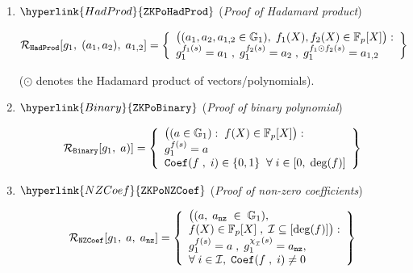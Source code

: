 \documentclass[11pt, lettersize, notitlepage, leqno, footskip=0.6cm]{article}
\newcommand{\bFp}{\mathbb{F}_p}
\newcommand{\slim}{\sum\limits}
\newcommand{\mc}{\mathcal}
\newcommand{\mb}{\mathbb}
\newcommand{\sub}{\subseteq}
\newcommand{\vs}{\vspace{-0.15cm}}
\newcommand{\noin}{\noindent}
\numberwithin{equation}{section}
\begin{document}
\begin{enumerate}[wide, labelwidth=!, labelindent=0pt, itemsep=-0.2ex]
\begin{comment}
\noin ($\circ$ denotes the dot product of vectors/polynomials) \end{comment}

\item $\hyperlink{HadProd}{\tt{ZKPoHadProd}}$ (\textit{Proof of Hadamard product}) \vspace{-3mm}

$$\mc{R}_{\tt{HadProd}}[g_1,\;(a_1,a_2),\; a_{1,2}] = \left\{\begin{array}{l} \big((a_1,a_2, a_{1,2}\in\mb{G}_1),\; f_1(X),f_2(X)\in \bFp[X]\big):\\ g_1^{f_1(s)} = a_1\;,\; g_1^{f_2(s)} = a_2 \;,\; g_1^{f_1\odot f_2(s)} = a_{1,2}\end{array} \right\} \vs $$

\noin ($\odot$ denotes the Hadamard product of vectors/polynomials).

\item $\hyperlink{Binary}{\tt{ZKPoBinary}}$ (\textit{Proof of binary polynomial}) \vspace{-3mm}

$$\mc{R}_{\tt{Binary}}[g_1,\;a)] = \left\{\begin{array}{l} \big( (a\in\mb{G}_1):\;
f(X)\in \bFp[X]\big): \\
g_1^{f(s)} = a\\ 
{\tt{Coef}}(f\;,\; i)\in\{0,1\} \;\;\forall\;i\in [0,\;\deg(f)]
\end{array}\right\} \vs $$




\item $\hyperlink{NZCoef}{\tt{ZKPoNZCoef}}$ (\textit{Proof of non-zero coefficients}) \vspace{-3mm}

\begin{comment}$$\mc{R}_{\tt{NZCoef}}[g_1,\;a,\;a_{\deg}] = \left\{\begin{array}{l} \big((a, a_{\deg}\in\mb{G}_1),\\
f(X)\in \bFp\;,\;(c_0,\cdots,c_{\deg(f)})\in (\bFp^*)^{\deg(f)+1} \big):\\
g_1^{f(s)} = a\;,\; g_1^{\deg(f)} = a_{\deg}\;,\;f(X) = \slim_{i=0}^{\deg(f)} c_i X^i \end{array}\right\} \vs $$ \end{comment}


$$\mc{R}_{\tt{NZCoef}}[g_1,\;a,\;a_{\tt{nz}}] = \left\{\begin{array}{l} \big((a,\;a_{\tt{nz}}\;\in\;\mb{G}_1),\\
f(X)\in \bFp[X]\;,\; \mc{I}\sub [ \deg(f)]\big):\\
g_1^{f(s)} = a\;,\;g_1^{\chi_{_\mc{I}}(s)} =a_{\tt{nz}},\\
\forall\;i\in \mc{I},\; {\tt{Coef}}(f\;,\; i)\neq 0 \end{array}\right\}  $$



\end{enumerate}
\end{document}
